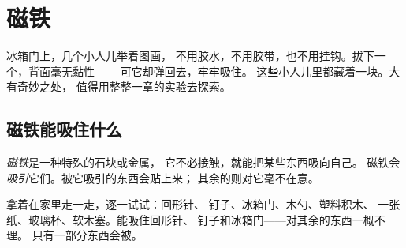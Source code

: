 \chapter{磁铁}\label{ch:g1:magnets}

冰箱门上，几个小人儿举着图画，
不用胶水，不用胶带，也不用挂钩。拔下一个，背面毫无黏性——
可它却弹回去，牢牢吸住。
这些小人儿里都藏着一块。大有奇妙之处，
值得用整整一章的实验去探索。

\section{磁铁能吸住什么}

\begin{definition}[磁铁]\label{def:g1:magnets:magnet}
\emph{磁铁}是一种特殊的石块或金属，
它不必接触，就能把某些东西吸向自己。
磁铁会\emph{吸引}它们。被它吸引的东西会贴上来；
其余的则对它毫不在意。
\end{definition}

\begin{example}\label{ex:g1:magnets:test}
拿着在家里走一走，逐一试试：回形针、
钉子、冰箱门、木勺、塑料积木、
一张纸、玻璃杯、软木塞。能吸住回形针、
钉子和冰箱门——对其余的东西一概不理。
只有一部分东西会被。
\end{example}


